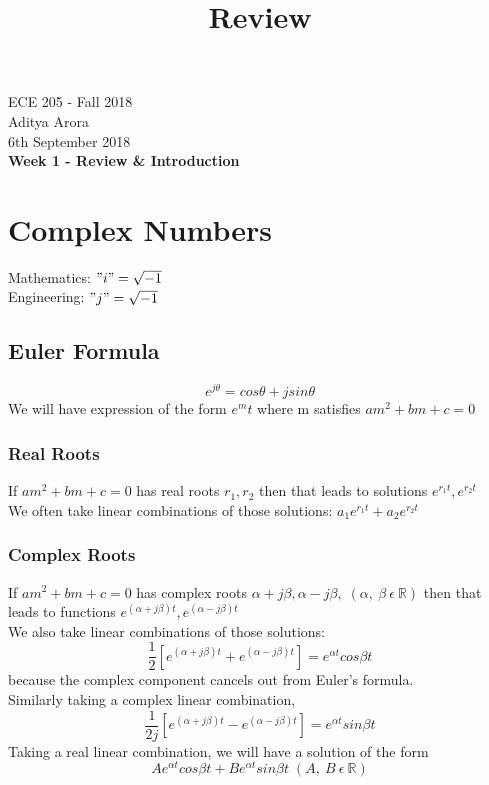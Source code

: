 \documentclass[11pt]{article}
\theoremstyle{definition}
\newcommand{\R}{\mathbb{R}}
\begin{document}
\title{Review}
\thispagestyle{empty}
\begin{center}
{\vspace{5mm} \LARGE ECE 205 - Fall 2018 \\ \vspace{5mm}Aditya Arora\\ \vspace{5mm} 6th September 2018}\\
{\vspace{5mm} \LARGE \bf Week 1 - Review \& Introduction}

\end{center}

\section{Complex Numbers}
Mathematics: $"i" = \sqrt{-1}$\\
Engineering: $"j" = \sqrt{-1}$
\subsection{Euler Formula}
$$e^{j\theta} = cos\theta + jsin\theta$$
We will have expression of the form $e^mt$ where m satisfies $am^2 + bm + c = 0$
\subsubsection{Real Roots}
If $am^2 + bm + c = 0$ has real roots $r_1, r_2$ then that leads to solutions $e^{r_1t}, e^{r_2t}$\\
We often take linear combinations of those solutions: $a_1e^{r_1t} + a_2e^{r_2t}$

\subsubsection{Complex Roots}
If $am^2 + bm + c = 0$ has complex roots $\alpha + j\beta, \alpha - j\beta, \;(\alpha,\: \beta\: \epsilon\: \R)$ then that leads to functions $e^{(\alpha + j\beta)t}, e^{(\alpha - j\beta)t}$\\
We also take linear combinations of those solutions: $$\frac{1}{2}[e^{(\alpha + j\beta)t} + e^{(\alpha - j\beta)t}] = e^{\alpha t}cos\beta t$$ because the complex component cancels out from Euler's formula. \\
Similarly taking a complex linear combination, $$\frac{1}{2j}[e^{(\alpha + j\beta)t} - e^{(\alpha - j\beta)t}] = e^{\alpha t}sin\beta t$$
Taking a real linear combination, we will have a solution of the form
$$Ae^{\alpha t}cos\beta t + Be^{\alpha t}sin\beta t \; (A,\:B\: \epsilon\: \R)$$
\end{document}
